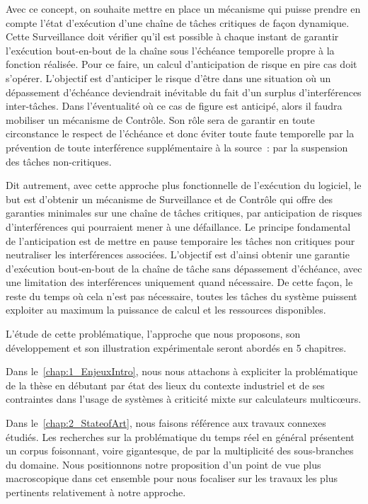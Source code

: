 \documentclass[french, a4paper, 11pt, twoside, pdftex]{StyleThese}
\begin{document}
Avec ce concept, on souhaite mettre en place un mécanisme qui puisse prendre en compte l'état d'exécution d'une chaîne de tâches critiques de façon dynamique. Cette Surveillance doit vérifier qu'il est possible à chaque instant de garantir l'exécution bout-en-bout de la chaîne sous l'échéance temporelle propre à la fonction réalisée. Pour ce faire, un calcul d'anticipation de risque en pire cas doit s'opérer. L'objectif est d'anticiper le risque d'être dans une situation où un dépassement d'échéance deviendrait inévitable du fait d'un surplus d'interférences inter-tâches. Dans l'éventualité où ce cas de figure est anticipé, alors il faudra mobiliser un mécanisme de Contrôle. Son rôle sera de garantir en toute circonstance le respect de l'échéance et donc éviter toute faute temporelle par la prévention de toute interférence supplémentaire à la source~: par la suspension des tâches non-critiques.

Dit autrement, avec cette approche plus fonctionnelle de l'exécution du logiciel, le but est d'obtenir un mécanisme de Surveillance et de Contrôle qui offre des garanties minimales sur une chaîne de tâches critiques, par anticipation de risques d'interférences qui pourraient mener à une défaillance. Le principe fondamental de l'anticipation est de mettre en pause temporaire les tâches non critiques pour neutraliser les interférences associées. L'objectif est d'ainsi obtenir une garantie d'exécution bout-en-bout de la chaîne de tâche sans dépassement d'échéance, avec une limitation des interférences uniquement quand nécessaire. De cette façon, le reste du temps où cela n'est pas nécessaire, toutes les tâches du système puissent exploiter au maximum la puissance de calcul et les ressources disponibles.

\smallbreak
\smallbreak
L’étude de cette problématique, l’approche que nous proposons, son développement et son
illustration expérimentale seront abordés en 5 chapitres.

Dans le~\autoref{chap:1_EnjeuxIntro}, nous nous attachons à expliciter la problématique de la thèse en débutant par état des lieux du contexte industriel et de ses contraintes dans l'usage de systèmes à criticité mixte sur calculateurs multicœurs.

Dans le~\autoref{chap:2_StateofArt}, nous faisons référence aux travaux connexes étudiés. Les recherches sur la problématique du temps réel en général présentent un corpus foisonnant, voire gigantesque, de par la multiplicité des sous-branches du domaine. Nous positionnons notre proposition d'un point de vue plus macroscopique dans cet ensemble pour nous focaliser sur les travaux les plus pertinents relativement à notre approche.
\end{document}
